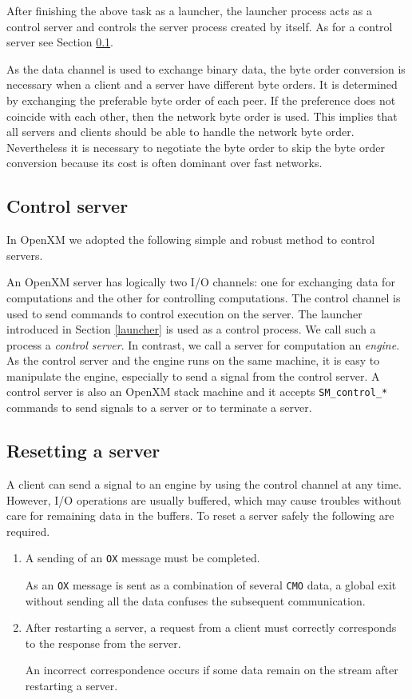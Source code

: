 After finishing the above task as a launcher, the launcher process
acts as a control server and controls the server process created by
itself. As for a control server see Section \ref{control}.

As the data channel is used to exchange binary data,
the byte order conversion is necessary when a
client and a server have different byte orders. It is determined by
exchanging the preferable byte order of each peer. If the preference
does not coincide with each other,
then the network byte order is used.
This implies that all servers and clients should be able to
handle the network byte
order. Nevertheless it is necessary to negotiate the byte order to
skip the byte order conversion because its cost is often dominant over
fast networks.


\subsection{Control server}
\label{control}
In OpenXM we adopted the following simple and robust method to 
control servers.

An OpenXM server has logically two I/O channels: one for exchanging
data for computations and the other for controlling computations. The
control channel is used to send commands to control execution on the
server. The launcher introduced in Section \ref{launcher}
is used as a control process. We call such a process a {\it
control server}. In contrast, we call a server for computation an {\it
engine}. As the control server and the engine runs on the
same machine, it is easy to manipulate the engine, especially to
send a signal from the control server. A control server is also an
OpenXM stack machine and it accepts {\tt SM\_control\_*} commands
to send signals to a server or to terminate a server.

\subsection{Resetting a server}

A client can send a signal to an engine by using the control channel 
at any time. However, I/O operations are usually buffered,
which may cause troubles without care for remaining data in 
the buffers.  To reset a server safely the following are required.

\begin{enumerate}
\item A sending of an {\tt OX} message must be completed.

As an {\tt OX} message is sent as a combination of several {\tt CMO}
data, a global exit without sending all the data confuses the
subsequent communication.

\item After restarting a server, a request from a client 
must correctly corresponds to the response from the server.

An incorrect correspondence occurs if some data remain on the stream
after restarting a server.
\end{enumerate}

